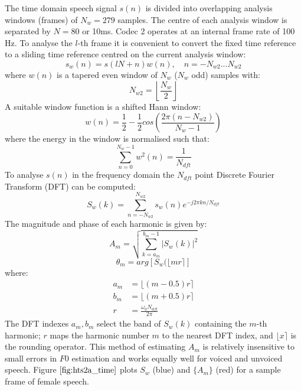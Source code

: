\documentclass{article}
\begin{document}
The time domain speech signal $s(n)$ is divided into overlapping analysis windows (frames) of $N_w=279$ samples. The centre of each analysis window is separated by $N=80$ or 10ms. Codec 2 operates at an internal frame rate of 100 Hz. To analyse the $l$-th frame it is convenient to convert the fixed time reference to a sliding time reference centred on the current analysis window:
\begin{equation}
s_w(n) = s(lN + n) w(n), \quad n = - N_{w2} ... N_{w2}
\end{equation}
where $w(n)$ is a tapered even window of $N_w$ ($N_w$ odd) samples with:
\begin{equation}
N_{w2} = \left \lfloor \frac{N_w}{2} \right \rfloor
\end{equation}
A suitable window function is a shifted Hann window:
\begin{equation}
w(n) = \frac{1}{2} - \frac{1}{2} cos \left(\frac{2 \pi (n- N_{w2})}{N_w-1} \right)
\end{equation}
where the energy in the window is normalised such that:
\begin{equation}
\sum_{n=0}^{N_w-1}w^2(n) = \frac{1}{N_{dft}}
\end{equation}
To analyse $s(n)$ in the frequency domain the $N_{dft}$ point Discrete Fourier Transform (DFT) can be computed:
\begin{equation}
S_w(k) = \sum_{n=-N_{w2}}^{N_{w2}} s_w(n) e^{-j 2 \pi k n / N_{dft}}
\end{equation}
The magnitude and phase of each harmonic is given by:
\begin{equation}
\label{eq:mag_est}
A_m = \sqrt{\sum_{k=a_m}^{b_m-1} |S_w(k)|^2 }
\end{equation}
\begin{equation}
\theta_m = arg \left[ S_w(\lfloor m r \rceil \right]
\end{equation}
where:
\begin{equation}
\begin{split}
a_m      &= \lfloor (m - 0.5)r \rceil \\
b_m      &= \lfloor (m + 0.5)r \rceil \\
r        &= \frac{\omega_0 N_{dft}}{2 \pi} 
\end{split}
\end{equation}
The DFT indexes $a_m, b_m$ select the band of $S_w(k)$ containing the $m$-th harmonic; $r$ maps the harmonic number $m$ to the nearest DFT index, and $\lfloor x \rceil$ is the rounding operator. This method of estimating $A_m$ is relatively insensitive to small errors in $F0$ estimation and works equally well for voiced and unvoiced speech.  Figure $\ref{fig:hts2a_time}$ plots $S_w$ (blue) and $\{A_m\}$ (red) for a sample frame of female speech.
\end{document}
